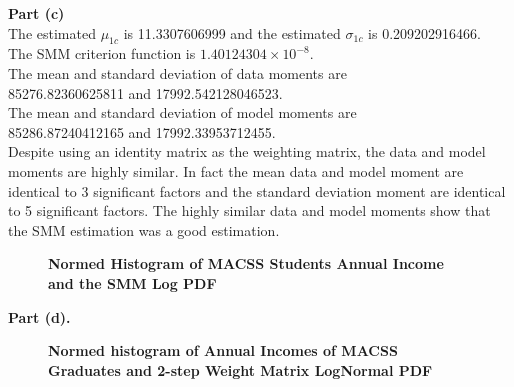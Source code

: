\documentclass[letterpaper,12pt]{article}
\theoremstyle{definition}
\begin{document}
\textbf{Part (c)} \\
The estimated $\mu_{1c}$ is 11.3307606999 and the estimated $\sigma_{1c}$ is 0.209202916466.\\
The SMM criterion function is $1.40124304\times10^{-8}$.\\
The mean and standard deviation of data moments are \\85276.82360625811 and 17992.542128046523.\\
The mean and standard deviation of model moments are \\85286.87240412165 and 17992.33953712455.\\
Despite using an identity matrix as the weighting matrix, the data and model moments are highly similar. In fact the mean data and model moment are identical to 3 significant factors and the standard deviation moment are identical to 5 significant factors. The highly similar data and model moments show that the SMM estimation was a good estimation. 
\begin{figure}[htb]\centering\captionsetup{width=4.0in}
  \caption{\textbf{Normed Histogram of MACSS Students Annual Income and the SMM Log PDF}}\label{FigExample}
\end{figure}

\pagebreak
\textbf{Part (d).} \\
\flushleft 
\begin{figure}[htb]\centering\captionsetup{width=4.0in}
  \caption{\textbf{Normed histogram of Annual Incomes of MACSS Graduates and 2-step Weight Matrix LogNormal PDF}}\label{FigExample}
\end{figure}
\end{document}

